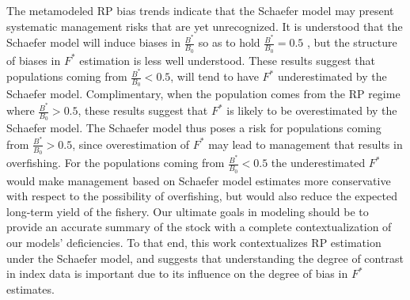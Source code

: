 %
The metamodeled RP bias trends indicate that the Schaefer model may present 
systematic management risks that are yet unrecognized. It is understood that 
the Schaefer model will induce biases in $\frac{B^*}{B_0}$ so as to hold 
$\frac{B^*}{B_0}=0.5$ \cite{maunder_is_2003, prager_reply_2003}, but the 
structure of biases in $F^*$ estimation is less well understood. These results 
suggest that populations coming from $\frac{B^*}{B_0}<0.5$, will tend to have $F^*$ 
underestimated by the Schaefer model. Complimentary, when the population comes 
from the RP regime where $\frac{B^*}{B_0}>0.5$, these results suggest that $F^*$ 
is likely to be overestimated by the Schaefer model. The Schaefer model thus 
poses a risk for populations coming from $\frac{B^*}{B_0}>0.5$, since 
overestimation of $F^*$ may lead to management that results in overfishing. 
For the populations coming from $\frac{B^*}{B_0}<0.5$ the 
underestimated $F^*$ would make management based on Schaefer model 
estimates more conservative with respect to the possibility of overfishing, but 
would also reduce the expected long-term yield of the fishery. 
Our ultimate goals in 
modeling should be to provide an accurate summary of the stock with a complete 
contextualization of our models' deficiencies. To that end, this work contextualizes
RP estimation under the Schaefer model, and suggests that understanding the 
degree of contrast in index data is important due to its influence on the degree of 
bias in $F^*$ estimates. 

